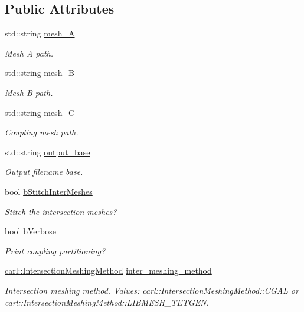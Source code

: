 \subsection*{Public Attributes}
\begin{DoxyCompactItemize}
\item 
std\+::string \hyperlink{structcarl_1_1parallel__intersection__params_aa984f7e6899406a1d17bdaa22e669e22}{mesh\+\_\+\+A}
\begin{DoxyCompactList}\small\item\em Mesh A path. \end{DoxyCompactList}\item 
std\+::string \hyperlink{structcarl_1_1parallel__intersection__params_a77a1bbaf19e80f8dfd2612c2e86acb45}{mesh\+\_\+\+B}
\begin{DoxyCompactList}\small\item\em Mesh B path. \end{DoxyCompactList}\item 
std\+::string \hyperlink{structcarl_1_1parallel__intersection__params_ad1cf6ec92655114a12be003b05526697}{mesh\+\_\+\+C}
\begin{DoxyCompactList}\small\item\em Coupling mesh path. \end{DoxyCompactList}\item 
std\+::string \hyperlink{structcarl_1_1parallel__intersection__params_a74ba855a7e3dc3595531e6204eb57db2}{output\+\_\+base}
\begin{DoxyCompactList}\small\item\em Output filename base. \end{DoxyCompactList}\item 
bool \hyperlink{structcarl_1_1parallel__intersection__params_a16529af2562e264bf3c5822d8d653b08}{b\+Stitch\+Inter\+Meshes}
\begin{DoxyCompactList}\small\item\em Stitch the intersection meshes? \end{DoxyCompactList}\item 
bool \hyperlink{structcarl_1_1parallel__intersection__params_a15197709febaff5f7082264db05d2aa7}{b\+Verbose}
\begin{DoxyCompactList}\small\item\em Print coupling partitioning? \end{DoxyCompactList}\item 
\hyperlink{namespacecarl_a4f72fd25137b97ac1ca1276ec549e5cf}{carl\+::\+Intersection\+Meshing\+Method} \hyperlink{structcarl_1_1parallel__intersection__params_ab94c6f1beb1d530141758397f49d6d08}{inter\+\_\+meshing\+\_\+method}
\begin{DoxyCompactList}\small\item\em Intersection meshing method. {\itshape Values}\+: carl\+::\+Intersection\+Meshing\+Method\+::\+C\+G\+A\+L or carl\+::\+Intersection\+Meshing\+Method\+::\+L\+I\+B\+M\+E\+S\+H\+\_\+\+T\+E\+T\+G\+E\+N. \end{DoxyCompactList}\end{DoxyCompactItemize}


